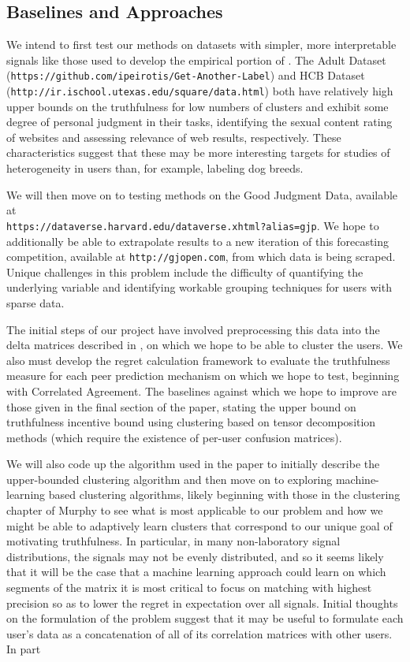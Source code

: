 \documentclass[a4paper, 11pt]{article}
\begin{document}
\subsection{Baselines and Approaches}
We intend to first test our methods on datasets with simpler, more interpretable signals like those used to develop the empirical portion of \citet{agarwal2017peer}. The Adult Dataset (\texttt{https://github.com/ipeirotis/Get-Another-Label}) and HCB Dataset \\ (\texttt{http://ir.ischool.utexas.edu/square/data.html}) both have relatively high upper bounds on the truthfulness for low numbers of clusters and exhibit some degree of personal judgment in their tasks, identifying the sexual content rating of websites and assessing relevance of web results, respectively. These characteristics suggest that these may be more interesting targets for studies of heterogeneity in users than, for example, labeling dog breeds.

We will then move on to testing methods on the Good Judgment Data, available at \\
\texttt{https://dataverse.harvard.edu/dataverse.xhtml?alias=gjp}. We hope to additionally be able to extrapolate results to a new iteration of this forecasting competition, available at \texttt{http://gjopen.com}, from which data is being scraped. Unique challenges in this problem include the difficulty of quantifying the underlying variable and identifying workable grouping techniques for users with sparse data.

The initial steps of our project have involved preprocessing this data into the delta matrices described in \citet{agarwal2017peer}, on which we hope to be able to cluster the users. We also must develop the regret calculation framework to evaluate the truthfulness measure for each peer prediction mechanism on which we hope to test, beginning with Correlated Agreement. The baselines against which we hope to improve are those given in the final section of the paper, stating the upper bound on truthfulness incentive bound using clustering based on tensor decomposition methods (which require the existence of per-user confusion matrices).

We will also code up the algorithm used in the paper to initially describe the upper-bounded clustering algorithm and then move on to exploring machine-learning based clustering algorithms, likely beginning with those in the clustering chapter of Murphy to see what is most applicable to our problem and how we might be able to adaptively learn clusters that correspond to our unique goal of motivating truthfulness. In particular, in many non-laboratory signal distributions, the signals may not be evenly distributed, and so it seems likely that it will be the case that a machine learning approach could learn on which segments of the matrix it is most critical to focus on matching with highest precision so as to lower the regret in expectation over all signals. Initial thoughts on the formulation of the problem suggest that it may be useful to formulate each user's data as a concatenation of all of its correlation matrices with other users. In part
\end{document}
